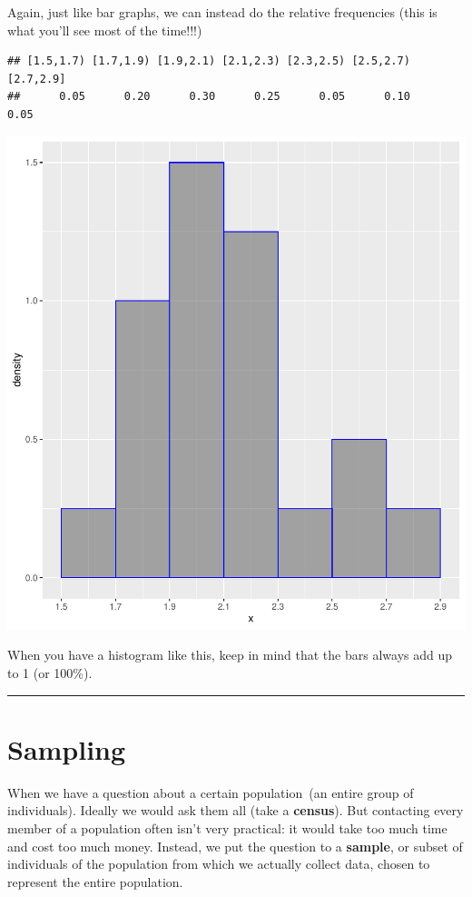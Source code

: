 \documentclass[
]{book}
\theoremstyle{definition}
\theoremstyle{definition}
\theoremstyle{definition}
\theoremstyle{definition}
\theoremstyle{remark}
\begin{document}
Again, just like bar graphs, we can instead do the relative frequencies
(this is what you'll see most of the time!!!)

\begin{verbatim}
## [1.5,1.7) [1.7,1.9) [1.9,2.1) [2.1,2.3) [2.3,2.5) [2.5,2.7) [2.7,2.9] 
##      0.05      0.20      0.30      0.25      0.05      0.10      0.05
\end{verbatim}

\includegraphics{_main_files/figure-latex/unnamed-chunk-32-1.pdf}

When you have a histogram like this, keep in mind that the bars always
add up to 1 (or 100\%).

\begin{center}\rule{0.5\linewidth}{0.5pt}\end{center}

\hypertarget{sampling}{%
\chapter{Sampling}\label{sampling}}

When we have a question about a certain population~(an entire group of
individuals). Ideally we would ask them all (take a \textbf{census}). But
contacting every member of a population often isn't very practical: it
would take too much time and cost too much money. Instead, we put the
question to a \textbf{sample}, or subset of individuals of the population
from which we actually collect data, chosen to represent the entire
population.
\end{document}
